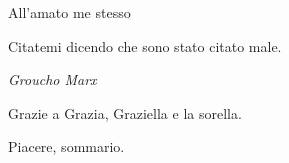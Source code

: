 \documentclass{article}
\begin{document}



\begin{flushright}
\noindent
All'amato me stesso
\end{flushright}



\begin{flushright}
\noindent
Citatemi dicendo che sono stato citato male.

\textit{Groucho Marx}
\end{flushright}



\ringraziamenti
Grazie a Grazia, Graziella e la sorella.


\sommario
Piacere, sommario.









\listofcodes












{}
\nocite{*}
\printbibliography
\end{document}
